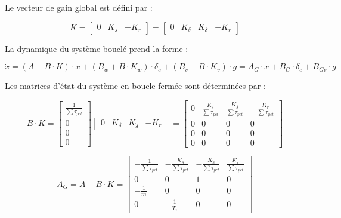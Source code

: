 Le vecteur de gain global est défini par :

\begin{equation}
    K = \begin{bmatrix} 0 & K_s & -K_r \end{bmatrix} = \begin{bmatrix} 0 & K_\delta & K_{\dot{\delta}} & -K_r \end{bmatrix}
\end{equation}

La dynamique du système bouclé prend la forme :

\begin{equation}
    \dot{x} = (A - B \cdot K) \cdot x + (B_w + B \cdot K_w) \cdot \delta_c + (B_v - B \cdot K_v) \cdot g = A_G \cdot x + B_G \cdot \delta_c + B_{Gv} \cdot g
\end{equation}

Les matrices d'état du système en boucle fermée sont déterminées par :

\begin{equation}
    B \cdot K = \begin{bmatrix} \frac{1}{\sum\tau_{pct}} \\ 0 \\ 0 \\ 0 \end{bmatrix} \begin{bmatrix} 0 & K_\delta & K_{\dot{\delta}} & -K_r \end{bmatrix} = \begin{bmatrix} 0 & \frac{K_\delta}{\sum\tau_{pct}} & \frac{K_{\dot{\delta}}}{\sum\tau_{pct}} & -\frac{K_r}{\sum\tau_{pct}} \\ 0 & 0 & 0 & 0 \\ 0 & 0 & 0 & 0 \\ 0 & 0 & 0 & 0 \end{bmatrix}
\end{equation}

\begin{equation}
    A_G = A - B \cdot K = \begin{bmatrix} -\frac{1}{\sum\tau_{pct}} & -\frac{K_\delta}{\sum\tau_{pct}} & -\frac{K_{\dot{\delta}}}{\sum\tau_{pct}} & \frac{K_r}{\sum\tau_{pct}} \\ 0 & 0 & 1 & 0 \\ -\frac{1}{m} & 0 & 0 & 0 \\ 0 & -\frac{1}{T_i} & 0 & 0 \end{bmatrix}
\end{equation}

